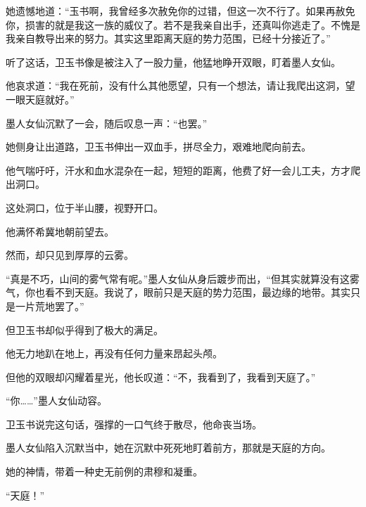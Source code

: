 \begin{this_body}
她遗憾地道：“玉书啊，我曾经多次赦免你的过错，但这一次不行了。如果再赦免你，损害的就是我这一族的威仪了。若不是我亲自出手，还真叫你逃走了。不愧是我亲自教导出来的努力。其实这里距离天庭的势力范围，已经十分接近了。”

听了这话，卫玉书像是被注入了一股力量，他猛地睁开双眼，盯着墨人女仙。

他哀求道：“我在死前，没有什么其他愿望，只有一个想法，请让我爬出这洞，望一眼天庭就好。”

墨人女仙沉默了一会，随后叹息一声：“也罢。”

她侧身让出道路，卫玉书伸出一双血手，拼尽全力，艰难地爬向前去。

他气喘吁吁，汗水和血水混杂在一起，短短的距离，他费了好一会儿工夫，方才爬出洞口。

这处洞口，位于半山腰，视野开口。

他满怀希冀地朝前望去。

然而，却只见到厚厚的云雾。

“真是不巧，山间的雾气常有呢。”墨人女仙从身后踱步而出，“但其实就算没有这雾气，你也看不到天庭。我说了，眼前只是天庭的势力范围，最边缘的地带。其实只是一片荒地罢了。”

但卫玉书却似乎得到了极大的满足。

他无力地趴在地上，再没有任何力量来昂起头颅。

但他的双眼却闪耀着星光，他长叹道：“不，我看到了，我看到天庭了。”

“你……”墨人女仙动容。

卫玉书说完这句话，强撑的一口气终于散尽，他命丧当场。

墨人女仙陷入沉默当中，她在沉默中死死地盯着前方，那就是天庭的方向。

她的神情，带着一种史无前例的肃穆和凝重。

“天庭！”

\end{this_body}

